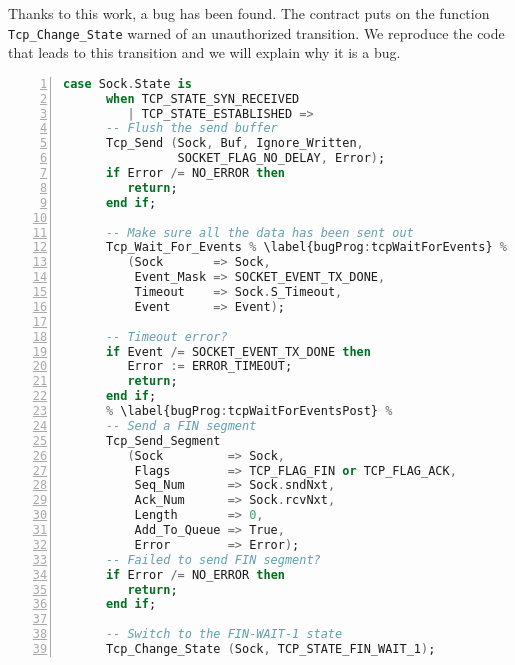 \documentclass[a4paper, 10pt]{article}
\begin{document}
    Thanks to this work, a bug has been found. The contract puts on the function \lstinline[language=Ada]{Tcp_Change_State}
    warned of an unauthorized transition. We reproduce the code that leads to this transition and we will explain
    why it is a bug.
    \begin{lstlisting}[language=Ada, basicstyle=\ttfamily\small, numbers=left, numberstyle=\tiny, escapechar=\%]
   case Sock.State is
      when TCP_STATE_SYN_RECEIVED
         | TCP_STATE_ESTABLISHED =>
      -- Flush the send buffer
      Tcp_Send (Sock, Buf, Ignore_Written,
                SOCKET_FLAG_NO_DELAY, Error);
      if Error /= NO_ERROR then
         return;
      end if;

      -- Make sure all the data has been sent out
      Tcp_Wait_For_Events % \label{bugProg:tcpWaitForEvents} %
         (Sock       => Sock,
          Event_Mask => SOCKET_EVENT_TX_DONE,
          Timeout    => Sock.S_Timeout,
          Event      => Event);

      -- Timeout error?
      if Event /= SOCKET_EVENT_TX_DONE then
         Error := ERROR_TIMEOUT;
         return;
      end if;
      % \label{bugProg:tcpWaitForEventsPost} %
      -- Send a FIN segment
      Tcp_Send_Segment
         (Sock         => Sock,
          Flags        => TCP_FLAG_FIN or TCP_FLAG_ACK,
          Seq_Num      => Sock.sndNxt,
          Ack_Num      => Sock.rcvNxt,
          Length       => 0,
          Add_To_Queue => True,
          Error        => Error);
      -- Failed to send FIN segment?
      if Error /= NO_ERROR then
         return;
      end if;

      -- Switch to the FIN-WAIT-1 state
      Tcp_Change_State (Sock, TCP_STATE_FIN_WAIT_1);
    \end{lstlisting}
\end{document}
